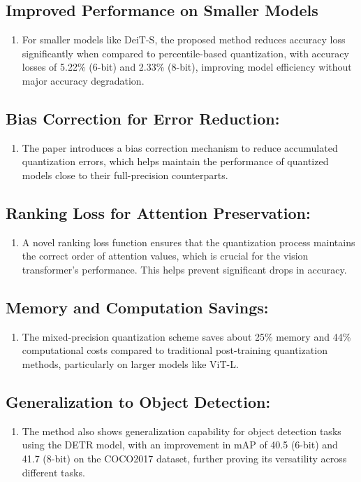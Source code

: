 \documentclass{report}
\begin{document}
	\subsection{Improved Performance on Smaller Models}
	\begin{enumerate}
		\item 
		For smaller models like DeiT-S, the proposed method reduces accuracy loss significantly when compared to percentile-based quantization, with accuracy losses of 5.22\% (6-bit) and 2.33\% (8-bit), improving model efficiency without major accuracy degradation.
	\end{enumerate}
	
	\subsection{Bias Correction for Error Reduction:}
	\begin{enumerate}
		\item 
		The paper introduces a bias correction mechanism to reduce accumulated quantization errors, which helps maintain the performance of quantized models close to their full-precision counterparts.
	\end{enumerate}
	
	\subsection{Ranking Loss for Attention Preservation:}
	\begin{enumerate}
		\item 
		A novel ranking loss function ensures that the quantization process maintains the correct order of attention values, which is crucial for the vision transformer's performance. This helps prevent significant drops in accuracy.
	\end{enumerate}
	
	\subsection{Memory and Computation Savings:}
	\begin{enumerate}
		\item 
		The mixed-precision quantization scheme saves about 25\% memory and 44\% computational costs compared to traditional post-training quantization methods, particularly on larger models like ViT-L.
	\end{enumerate}
	
	\subsection{Generalization to Object Detection:}
	\begin{enumerate}
		\item 
		The method also shows generalization capability for object detection tasks using the DETR model, with an improvement in mAP of 40.5 (6-bit) and 41.7 (8-bit) on the COCO2017 dataset, further proving its versatility across different tasks.
	\end{enumerate}
	
\end{document}
